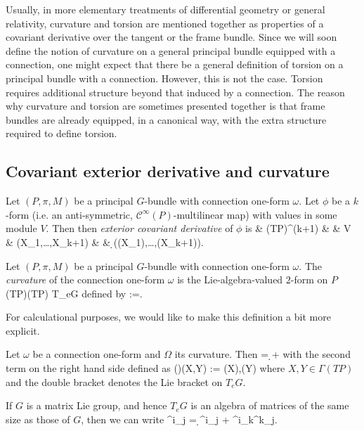 
Usually, in more elementary treatments of differential geometry or general relativity, curvature and torsion are mentioned together as properties of a covariant derivative over the tangent or the frame bundle. Since we will soon define the notion of curvature on a general principal bundle equipped with a connection, one might expect that there be a general definition of torsion on a principal bundle with a connection. However, this is not the case. Torsion requires additional structure beyond that induced by a connection. The reason why curvature and torsion are sometimes presented together is that frame bundles are already equipped, in a canonical way, with the extra structure required to define torsion.

\subsection{Covariant exterior derivative and curvature}

\bd
Let $(P,\pi,M)$ be a principal $G$-bundle with connection one-form $\omega$. Let $\phi$ be a $k$-form (i.e. an anti-symmetric, $\mathcal{C}^\infty(P)$-multilinear map) with values in some module $V$. Then then \emph{exterior covariant derivative} of $\phi$ is
\D\phi\cl & \Gamma(TP)^{\times (k+1)} & \to & V\\
& (X_1,\ldots,X_{k+1}) & \mapsto & \d \phi (\hor(X_1),\ldots,\hor(X_{k+1})).
\ei
\ed

\bd
Let $(P,\pi,M)$ be a principal $G$-bundle with connection one-form $\omega$. The \emph{curvature} of the connection one-form $\omega$ is the Lie-algebra-valued $2$-form on $P$
\bse
\Omega\cl \Gamma(TP)\times \Gamma(TP) \to T_eG
\ese
defined by 
\bse
\Omega:=\D \omega.
\ese
\ed

For calculational purposes, we would like to make this definition a bit more explicit.

\bp
Let $\omega$ be a connection one-form and $\Omega$ its curvature. Then
\bse
\tag{$\star$}
\Omega = \d \omega + \omega \Wedge \omega
\ese
with the second term on the right hand side defined as
\bse
(\omega\Wedge\omega )(X,Y) := \llbracket\omega(X),\omega(Y) \rrbracket
\ese
where $X,Y\in \Gamma(TP)$ and the double bracket denotes the Lie bracket on $T_eG$.
\ep

\br
If $G$ is a matrix Lie group, and hence $T_eG$ is an algebra of matrices of the same size as those of $G$, then we can write
\bse
\Omega^i_{\phantom{i}j} = \d \omega^i_{\phantom{i}j} + \omega^i_{\phantom{i}k}\wedge \omega^k_{\phantom{k}j}.
\ese
\er


